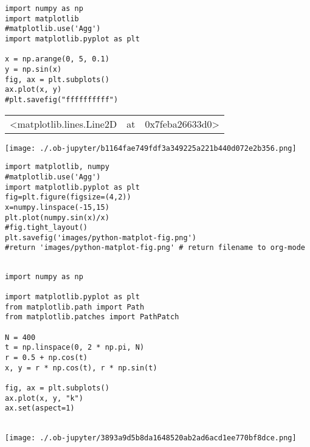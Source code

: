 \documentclass[11pt]{article}
\author{maint}
\date{\today}
\title{}
\begin{document}
\tableofcontents

\begin{verbatim}
import numpy as np
import matplotlib
#matplotlib.use('Agg')
import matplotlib.pyplot as plt

x = np.arange(0, 5, 0.1)
y = np.sin(x)
fig, ax = plt.subplots()
ax.plot(x, y)
#plt.savefig("ffffffffff")

\end{verbatim}

\begin{center}
\begin{tabular}{lll}
<matplotlib.lines.Line2D & at & 0x7feba26633d0>\\
\end{tabular}
\end{center}
\begin{center}
\texttt{[image: ./.ob-jupyter/b1164fae749fdf3a349225a221b440d072e2b356.png]}
\end{center}



\begin{verbatim}
import matplotlib, numpy
#matplotlib.use('Agg')
import matplotlib.pyplot as plt
fig=plt.figure(figsize=(4,2))
x=numpy.linspace(-15,15)
plt.plot(numpy.sin(x)/x)
#fig.tight_layout()
plt.savefig('images/python-matplot-fig.png')
#return 'images/python-matplot-fig.png' # return filename to org-mode
\end{verbatim}

\begin{verbatim}

import numpy as np

import matplotlib.pyplot as plt
from matplotlib.path import Path
from matplotlib.patches import PathPatch

N = 400
t = np.linspace(0, 2 * np.pi, N)
r = 0.5 + np.cos(t)
x, y = r * np.cos(t), r * np.sin(t)

fig, ax = plt.subplots()
ax.plot(x, y, "k")
ax.set(aspect=1)

\end{verbatim}

\begin{center}
\begin{tabular}{l}
\\
\end{tabular}
\end{center}
\begin{center}
\texttt{[image: ./.ob-jupyter/3893a9d5b8da1648520ab2ad6acd1ee770bf8dce.png]}
\end{center}
\end{document}
